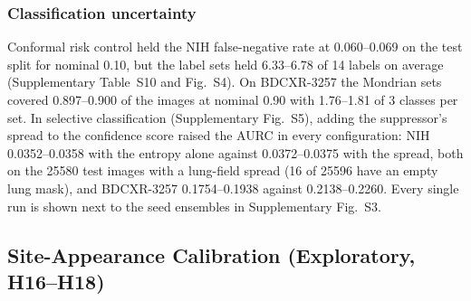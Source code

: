 \subsubsection{Classification uncertainty}
Conformal risk control held the NIH false-negative rate at 0.060--0.069 on the test split for nominal 0.10, but the label sets held
6.33--6.78 of 14 labels on average (Supplementary Table~S10 and Fig.~S4). On BDCXR-3257 the Mondrian sets covered 0.897--0.900 of
the images at nominal 0.90 with 1.76--1.81 of 3 classes per set. In selective classification (Supplementary Fig.~S5), adding the
suppressor's spread to the confidence score raised the AURC in every configuration: NIH 0.0352--0.0358 with the entropy alone against
0.0372--0.0375 with the spread, both on the \num{25580} test images with a lung-field spread (16 of \num{25596} have an empty lung mask),
and BDCXR-3257 0.1754--0.1938 against 0.2138--0.2260. Every single run is shown next to the seed ensembles in Supplementary Fig.~S3.

\subsection{Site-Appearance Calibration (Exploratory, H16--H18)}
\label{sec:res-sitecal}
\begin{table}[!t]
\centering
\caption{Site-appearance calibration (exploratory). Top: fidelity on the 51 held-out SZCH-X-Rays pairs, every method as is and with the
smooth correction of Eq.~\eqref{eq:sitecal} fitted on the 24 development pairs (BS-LDM, trained on this site's pairs, is not corrected).
Middle: H16--H18, paired differences with image bootstrap (H16, H16b, H17: one-sided 95\,\% lower bounds) or image-cluster bootstrap
intervals (absorption on 1,470 VinDr-RibCXR sites), \num{10000} resamples. Bottom: VinDr-RibCXR (metrics only), mean lesion absorption of
one audit run with all four models (shared sites) and the rib benchmark, as is and site-calibrated.}
\label{tab:sitecal}
\end{table}

